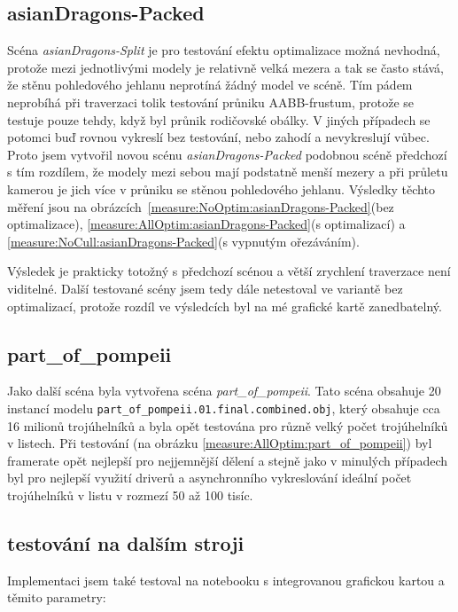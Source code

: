 \documentclass[report,11pt]{elsarticle}
\begin{document}
\subsection{asianDragons-Packed}

Scéna \textit{asianDragons-Split} je pro testování efektu optimalizace možná
nevhodná, protože mezi jednotlivými modely je relativně velká mezera a tak se
často stává, že stěnu pohledového jehlanu neprotíná žádný model ve scéně.
Tím pádem neprobíhá při traverzaci tolik testování průniku AABB-frustum, protože
se testuje pouze tehdy, když byl průnik rodičovské obálky. V jiných případech se
potomci buď rovnou vykreslí bez testování, nebo zahodí a nevykreslují vůbec.
Proto jsem vytvořil novou scénu \textit{asianDragons-Packed} podobnou scéně
předchozí s tím rozdílem, že modely mezi sebou mají podstatně menší mezery a při
průletu kamerou je jich více v průniku se stěnou pohledového jehlanu. Výsledky
těchto měření jsou na obrázcích~\ref{measure:NoOptim:asianDragons-Packed}(bez
optimalizace), \ref{measure:AllOptim:asianDragons-Packed}(s optimalizací) a
\ref{measure:NoCull:asianDragons-Packed}(s vypnutým ořezáváním).

Výsledek je prakticky totožný s předchozí scénou a větší zrychlení traverzace
není viditelné. Další testované scény jsem tedy dále netestoval ve variantě bez
optimalizací, protože rozdíl ve výsledcích byl na mé grafické kartě zanedbatelný.

\subsection{part\_of\_pompeii}

Jako další scéna byla vytvořena scéna \textit{part\_of\_pompeii}. Tato scéna
obsahuje 20 instancí modelu \texttt{part\_of\_pompeii.01.final.combined.obj},
který obsahuje cca 16 milionů trojúhelníků a byla opět testována pro různě
velký počet trojúhelníků v listech. Při testování (na obrázku
\ref{measure:AllOptim:part_of_pompeii}) byl framerate opět nejlepší pro nejjemnější
dělení a stejně jako v minulých případech byl pro nejlepší využití driverů a
asynchronního vykreslování ideální počet trojúhelníků v listu v rozmezí 50 až
100 tisíc.

\subsection{testování na dalším stroji}

Implementaci jsem také testoval na notebooku s integrovanou grafickou kartou a
těmito parametry:
\end{document}
